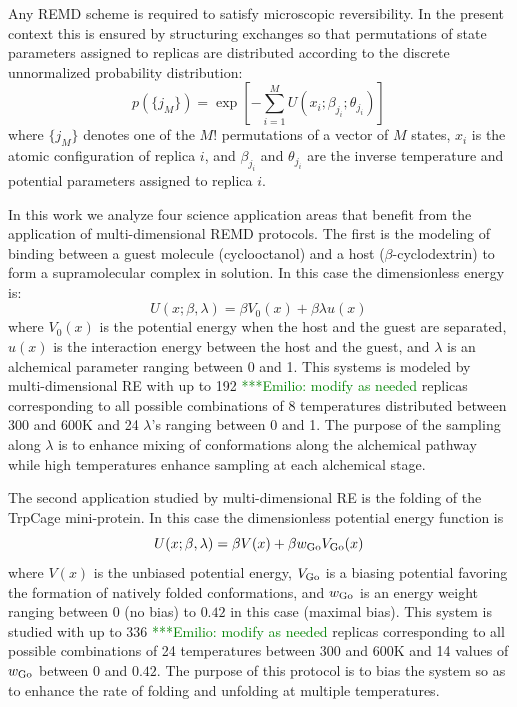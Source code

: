 \documentclass{sig-alternate}
\newcommand{\egnote}[1]{ {\textcolor{green} { ***Emilio: #1 }}}
\begin{document}
Any REMD scheme is required to satisfy microscopic reversibility. In the 
present context this is ensured by structuring exchanges so that permutations 
of state parameters assigned to replicas are distributed according to the 
discrete unnormalized probability distribution:\cite{chodera2011replica}
\begin{equation}
p(\{j_M\})=\exp\left[-\sum_{i=1}^M U(x_i;\beta_{j_i};\theta_{j_i})\right] \,
\end{equation}
where $\{j_M\}$ denotes one of the $M!$ permutations of a vector of $M$ states,
$x_i$ is the atomic configuration of replica $i$, and $\beta_{j_i}$ and 
$\theta_{j_i}$ are the inverse temperature and potential parameters assigned to
replica $i$.

In this work we analyze four science application areas that benefit from the 
application of multi-dimensional REMD protocols. The first is the modeling of 
binding between a guest molecule (cyclooctanol) and a host 
($\beta$-cyclodextrin) to form a supramolecular complex in solution.\cite{Gallicchio2012a} In this case the dimensionless energy is:\cite{Gallicchio2010}
\begin{equation}
U(x;\beta,\lambda) = \beta V_0(x) + \beta \lambda u(x) \,
\end{equation}
where $V_0(x)$ is the potential energy when the host and the guest are 
separated, $u(x)$ is the interaction energy between the host and the guest, and
$\lambda$ is an alchemical parameter ranging between 0 and 1. This systems is 
modeled by multi-dimensional RE with up to 192 \egnote{modify as needed} 
replicas corresponding to all possible combinations of 8 temperatures 
distributed between 300 and 600K and 24 $\lambda$'s ranging between 0 and 1. 
The purpose of the sampling along $\lambda$ is to enhance mixing of 
conformations along the alchemical pathway while high temperatures enhance 
sampling at each alchemical stage.

The second application studied by multi-dimensional RE is the folding of the 
TrpCage mini-protein. In this case the dimensionless potential energy function 
is
\begin{equation}
U(x;\beta,\lambda) = \beta V(x) + \beta w_{\rm Go} V_{\rm Go}(x) \,
\end{equation}
where $V(x)$ is the unbiased potential energy, $V_{\rm Go}$ is a biasing 
potential favoring the formation of natively folded conformations,\cite{pogorelov2004variations} and 
$w_{\rm Go}$ is an energy weight ranging between 0 (no bias) to $0.42$ in this 
case (maximal bias). This system is studied with up to 336 \egnote{modify as 
  needed} replicas corresponding to all possible combinations of 24 
temperatures between 300 and 600K and 14 values of  $w_{\rm Go}$ between 0 and 
$0.42$. The purpose of this protocol is to bias the system so as to enhance the
rate of folding and unfolding at multiple temperatures.
\end{document}
